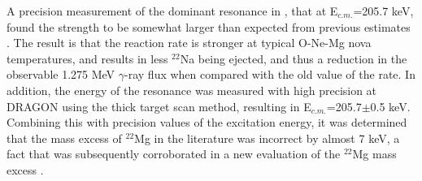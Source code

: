 A precision measurement of the dominant resonance in , that at E$_{c.m.}$=205.7 keV, found the strength to be somewhat larger than expected from previous 
estimates \cite{jos99}. The result is that the reaction rate is stronger at typical O-Ne-Mg nova temperatures, and results in less $^{22}$Na being ejected, and thus a reduction in the observable 1.275 MeV $\gamma$-ray flux when compared with the old value of the rate. In addition, the energy of the resonance was measured with high precision at DRAGON using the thick target scan method, resulting in E$_{c.m.}$=205.7$\pm$0.5 keV. Combining this with precision values of the excitation energy, it was determined that the mass excess of $^{22}$Mg in the literature was incorrect by almost 7 keV, a fact that was subsequently corroborated in a new evaluation of the $^{22}$Mg mass excess \cite{har03}.  

